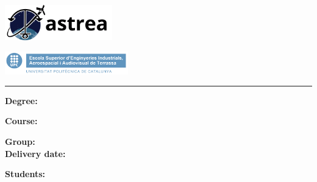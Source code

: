 
\thispagestyle{CoverPage}


\begin{center}\bf

\includegraphics[width=0.35\textwidth]{./doc_config/images/logo.png}

\vspace{50pt}

{\large \School}

\vspace{10pt}

\includegraphics[width=0.4\textwidth]{./doc_config/images/UPC_ESEIAAT.jpg}

\vspace{50pt}

{\fontsize{30pt}{20pt}\selectfont \ProjectName}

\vspace{10pt}

{\Huge \Acronym}


\textcolor{UPC_blue}{\rule{\textwidth}{.6pt}}

{\Large \DocType}

\end{center}

\vspace{50pt}

\textbf{Degree:} \Degree

\textbf{Course:} \Course

\textbf{Group:} \GrCode\\

\textbf{Delivery date:} \DocDate\\

\vspace{10pt}

\textbf{Students:}\vspace{7pt}

